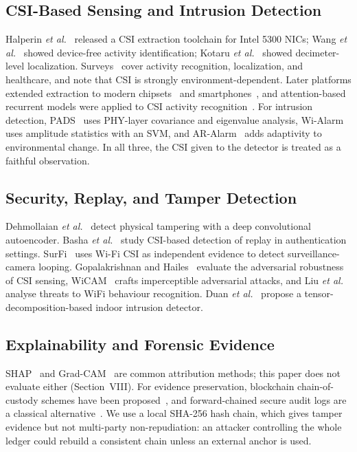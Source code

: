 \documentclass[conference]{IEEEtran}
\begin{document}
\subsection{CSI-Based Sensing and Intrusion Detection}
Halperin \emph{et al.}~\cite{halperin2011} released a CSI extraction toolchain for Intel 5300 NICs; Wang \emph{et al.}~\cite{wang2014eeyes} showed device-free activity identification; Kotaru \emph{et al.}~\cite{kotaru2015spotfi} showed decimeter-level localization. Surveys~\cite{yousefi2017,ma2019} cover activity recognition, localization, and healthcare, and note that CSI is strongly environment-dependent. Later platforms extended extraction to modern chipsets~\cite{gringoli2019} and smartphones~\cite{hernandez2020}, and attention-based recurrent models were applied to CSI activity recognition~\cite{chen2018ablstm}. For intrusion detection, PADS~\cite{qian2014pads} uses PHY-layer covariance and eigenvalue analysis, Wi-Alarm~\cite{wang2019wialarm} uses amplitude statistics with an SVM, and AR-Alarm~\cite{li2017aralarm} adds adaptivity to environmental change. In all three, the CSI given to the detector is treated as a faithful observation.

\subsection{Security, Replay, and Tamper Detection}
Dehmollaian \emph{et al.}~\cite{dehmollaian2020} detect physical tampering with a deep convolutional autoencoder. Basha \emph{et al.}~\cite{basha2024} study CSI-based detection of replay in authentication settings. SurFi~\cite{lakshmanan2019surfi} uses Wi-Fi CSI as independent evidence to detect surveillance-camera looping. Gopalakrishnan and Hailes~\cite{gopalakrishnan2025} evaluate the adversarial robustness of CSI sensing, WiCAM~\cite{xu2022wicam} crafts imperceptible adversarial attacks, and Liu \emph{et al.}~\cite{liu2024time} analyse threats to WiFi behaviour recognition. Duan \emph{et al.}~\cite{duan2026wiid} propose a tensor-decomposition-based indoor intrusion detector.

\subsection{Explainability and Forensic Evidence}
SHAP~\cite{lundberg2017} and Grad-CAM~\cite{selvaraju2017} are common attribution methods; this paper does not evaluate either (Section~VIII). For evidence preservation, blockchain chain-of-custody schemes have been proposed~\cite{lone2019,choudhary2023}, and forward-chained secure audit logs are a classical alternative~\cite{schneier1999}. We use a local SHA-256 hash chain, which gives tamper evidence but not multi-party non-repudiation: an attacker controlling the whole ledger could rebuild a consistent chain unless an external anchor is used.
\end{document}
